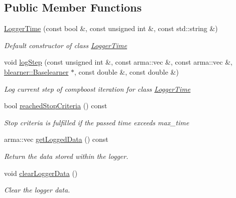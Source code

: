 \subsection*{Public Member Functions}
\begin{DoxyCompactItemize}
\item 
\mbox{\hyperlink{classlogger_1_1_logger_time_a9dd340473ea5d705bc1a5bcdc948c0b3}{Logger\+Time}} (const bool \&, const unsigned int \&, const std\+::string \&)
\begin{DoxyCompactList}\small\item\em Default constructor of class {\ttfamily \mbox{\hyperlink{classlogger_1_1_logger_time}{Logger\+Time}}} \end{DoxyCompactList}\item 
void \mbox{\hyperlink{classlogger_1_1_logger_time_aec35d7d3c780043ff2b7c9f71712abbc}{log\+Step}} (const unsigned int \&, const arma\+::vec \&, const arma\+::vec \&, \mbox{\hyperlink{classblearner_1_1_baselearner}{blearner\+::\+Baselearner}} $\ast$, const double \&, const double \&)
\begin{DoxyCompactList}\small\item\em Log current step of compboost iteration for class {\ttfamily \mbox{\hyperlink{classlogger_1_1_logger_time}{Logger\+Time}}} \end{DoxyCompactList}\item 
bool \mbox{\hyperlink{classlogger_1_1_logger_time_a727f16a2deed4d64293844615f18df08}{reached\+Stop\+Criteria}} () const
\begin{DoxyCompactList}\small\item\em Stop criteria is fulfilled if the passed time exceeds {\ttfamily max\+\_\+time} \end{DoxyCompactList}\item 
arma\+::vec \mbox{\hyperlink{classlogger_1_1_logger_time_a8723a078c86c1470208dccadffed5c1b}{get\+Logged\+Data}} () const
\begin{DoxyCompactList}\small\item\em Return the data stored within the logger. \end{DoxyCompactList}\item 
void \mbox{\hyperlink{classlogger_1_1_logger_time_a0bcce74556cf50de86b8d7333d82e919}{clear\+Logger\+Data}} ()
\begin{DoxyCompactList}\small\item\em Clear the logger data. \end{DoxyCompactList}\item 

\end{DoxyCompactItemize}
